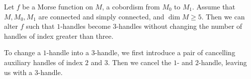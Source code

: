 \begin{theorem}
    Let $f$ be a Morse function on $M$, a cobordism from $M_0$ to $M_1$.
    Assume that $M, M_0, M_1$ are connected and simply connected,  and $\dim M \ge  5$.
    Then we can alter $f$ such that  $1$-handles become $3$-handles without changing the number of handles of index greater than three.
    \label{thm:one-to-three}
\end{theorem}
\begin{marginfigure}
    \centering
    \caption{
        To change a $1$-handle into a $3$-handle, we first introduce a pair of cancelling auxiliary handles of index $2$ and $3$. 
        Then we cancel the $1$- and $2$-handle, leaving us with a  $3$-handle.
    }
    \label{fig:changing-one-handles-in-three-handles}
\end{marginfigure}
